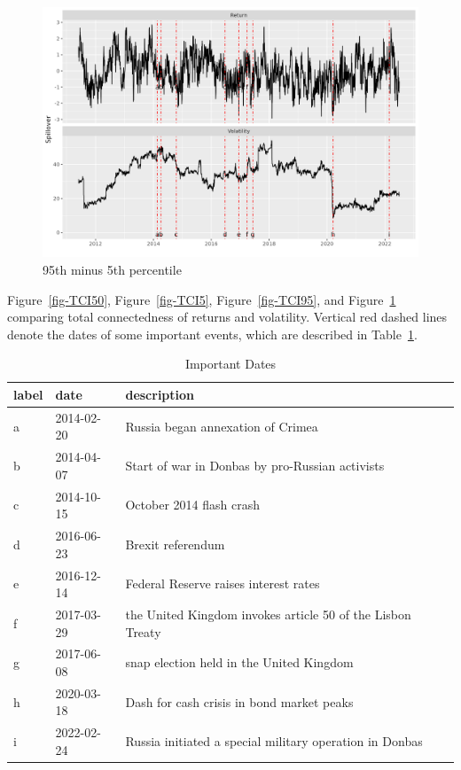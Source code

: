 \documentclass[
  number]{elsarticle}
\begin{document}
\begin{figure}[H]

{\centering \includegraphics{plots/fig-TCIrtd.png}

}

\caption{\label{fig-TCIrtd}95th minus 5th percentile}

\end{figure}

Figure~\ref{fig-TCI50}, Figure~\ref{fig-TCI5}, Figure~\ref{fig-TCI95},
and Figure~\ref{fig-TCIrtd} comparing total connectedness of returns and
volatility. Vertical red dashed lines denote the dates of some important
events, which are described in Table~\ref{tbl-dates}.

\hypertarget{tbl-dates}{}
\begin{table}[H]
\caption{\label{tbl-dates}Important Dates }\tabularnewline

\centering
\begin{tabular}[t]{lll}
\toprule
label & date & description\\
\midrule
a & 2014-02-20 & Russia began annexation of Crimea\\
b & 2014-04-07 & Start of war in Donbas by pro-Russian activists\\
c & 2014-10-15 & October 2014 flash crash\\
d & 2016-06-23 & Brexit referendum\\
e & 2016-12-14 & Federal Reserve raises interest rates\\
\addlinespace
f & 2017-03-29 & the United Kingdom invokes article 50 of the Lisbon Treaty\\
g & 2017-06-08 & snap election held in the United Kingdom\\
h & 2020-03-18 & Dash for cash crisis in bond market peaks\\
i & 2022-02-24 & Russia initiated a special military operation in Donbas\\
\bottomrule
\end{tabular}
\end{table}
\end{document}
